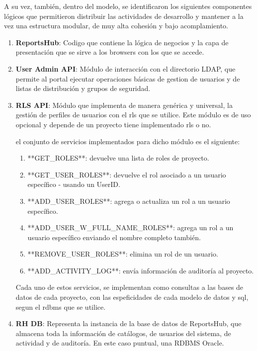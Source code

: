 A su vez, también, dentro del modelo, se identificaron los siguientes componentes lógicos que permitieron distribuir las actividades de desarrollo y mantener a la vez una estructura modular, de muy alta cohesión y bajo acomplamiento.

\begin{enumerate}
    \item \textbf{ReportsHub}:
        Codigo que contiene la lógica de negocios y la capa de presentación que se sirve a los browsers con los que se accede.

    \item \textbf{User Admin API}: Módulo de interacción con el directorio LDAP, que permite al portal ejecutar operaciones básicas de gestion de usuarios y de listas de distribución y grupos de seguridad.
        
    \item \textbf{RLS API}: Módulo que implementa de manera genérica y universal, la gestión de perfiles de usuarios con el \gls{rls} que se utilice. Este módulo es de uso opcional y depende de un proyecto tiene implementado \gls{rls} o no.
    
        el conjunto de servicios implementados para dicho módulo es el siguiente:
        \begin{enumerate}
            \item **GET\_ROLES**: devuelve una lista de roles de proyecto.
            \item **GET\_USER\_ROLES**: devuelve el rol asociado a un usuario específico - usando un UserID.
            \item **ADD\_USER\_ROLES**: agrega o actualiza un rol a un usuario específico.
            \item **ADD\_USER\_W\_FULL\_NAME\_ROLES**: agrega un rol a un usuario específico enviando el nombre completo también.
            \item **REMOVE\_USER\_ROLES**: elimina un rol de un usuario.
            \item **ADD\_ACTIVITY\_LOG**: envía información de auditoría al proyecto.
        \end{enumerate}


    Cada uno de estos servicios, se implementan como consultas a las bases de datos de cada proyecto, con las espeficidades de cada modelo de datos y sql, segun el rdbms que se utilice.
    
    \item \textbf{RH DB}: Representa la instancia de la base de datos de ReportsHub, que almacena toda la información de catálogos, de usuarios del sistema, de actividad y de auditoría. En este caso puntual, una RDBMS Oracle.
\end{enumerate}

